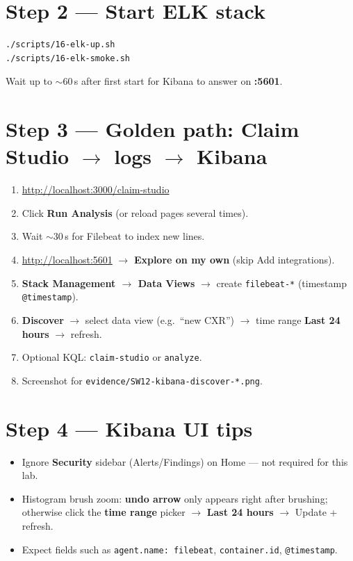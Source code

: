 \documentclass[11pt,a4paper]{report}
\begin{document}
\section{Step 2 --- Start ELK stack}
\begin{lstlisting}[style=bash]
./scripts/16-elk-up.sh
./scripts/16-elk-smoke.sh
\end{lstlisting}
Wait up to $\sim$60\,s after first start for Kibana to answer on \textbf{:5601}.

\section{Step 3 --- Golden path: Claim Studio $\rightarrow$ logs $\rightarrow$ Kibana}
\begin{enumerate}
  \item \url{http://localhost:3000/claim-studio}
  \item Click \textbf{Run Analysis} (or reload pages several times).
  \item Wait $\sim$30\,s for Filebeat to index new lines.
  \item \url{http://localhost:5601} $\rightarrow$ \textbf{Explore on my own} (skip Add integrations).
  \item \textbf{Stack Management $\rightarrow$ Data Views} $\rightarrow$ create \texttt{filebeat-*} (timestamp \texttt{@timestamp}).
  \item \textbf{Discover} $\rightarrow$ select data view (e.g.\ ``new CXR'') $\rightarrow$ time range \textbf{Last 24 hours} $\rightarrow$ refresh.
  \item Optional KQL: \texttt{claim-studio} or \texttt{analyze}.
  \item Screenshot for \texttt{evidence/SW12-kibana-discover-*.png}.
\end{enumerate}

\section{Step 4 --- Kibana UI tips}
\begin{itemize}
  \item Ignore \textbf{Security} sidebar (Alerts/Findings) on Home --- not required for this lab.
  \item Histogram brush zoom: \textbf{undo arrow} only appears right after brushing; otherwise click the \textbf{time range} picker $\rightarrow$ \textbf{Last 24 hours} $\rightarrow$ Update + refresh.
  \item Expect fields such as \texttt{agent.name: filebeat}, \texttt{container.id}, \texttt{@timestamp}.
\end{itemize}
\end{document}
